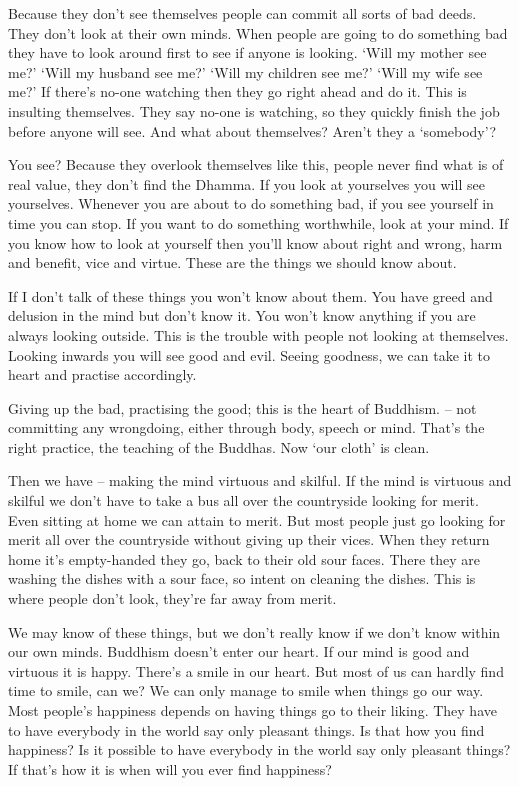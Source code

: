 Because they don't see themselves people can commit all sorts of bad deeds. They don't look at their own minds. When people are going to do something bad they have to look around first to see if anyone is looking. `Will my mother see me?' `Will my husband see me?' `Will my children see me?' `Will my wife see me?' If there's no-one watching then they go right ahead and do it. This is insulting themselves. They say no-one is watching, so they quickly finish the job before anyone will see. And what about themselves? Aren't they a `somebody'?

You see? Because they overlook themselves like this, people never find what is of real value, they don't find the Dhamma. If you look at yourselves you will see yourselves. Whenever you are about to do something bad, if you see yourself in time you can stop. If you want to do something worthwhile, look at your mind. If you know how to look at yourself then you'll know about right and wrong, harm and benefit, vice and virtue. These are the things we should know about. 

If I don't talk of these things you won't know about them. You have greed and delusion in the mind but don't know it. You won't know anything if you are always looking outside. This is the trouble with people not looking at themselves. Looking inwards you will see good and evil. Seeing goodness, we can take it to heart and practise accordingly. 

Giving up the bad, practising the good; this is the heart of Buddhism.  -- not committing any wrongdoing, either through body, speech or mind. That's the right practice, the teaching of the Buddhas. Now `our cloth' is clean. 

Then we have  -- making the mind virtuous and skilful. If the mind is virtuous and skilful we don't have to take a bus all over the countryside looking for merit. Even sitting at home we can attain to merit. But most people just go looking for merit all over the countryside without giving up their vices. When they return home it's empty-handed they go, back to their old sour faces. There they are washing the dishes with a sour face, so intent on cleaning the dishes. This is where people don't look, they're far away from merit. 

We may know of these things, but we don't really know if we don't know within our own minds. Buddhism doesn't enter our heart. If our mind is good and virtuous it is happy. There's a smile in our heart. But most of us can hardly find time to smile, can we? We can only manage to smile when things go our way. Most people's happiness depends on having things go to their liking. They have to have everybody in the world say only pleasant things. Is that how you find happiness? Is it possible to have everybody in the world say only pleasant things? If that's how it is when will you ever find happiness? 

